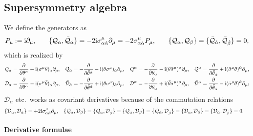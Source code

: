 \documentclass[CheatSheet]{subfiles}
\begin{document}
\subsection{Supersymmetry algebra}
We define the generators as
\begin{alignat}{3}
 P_\mu
 &:= {\mathrm{i}}\partial_\mu,
\quad&
 \{{\mathcal Q}_\alpha, \bar {\mathcal Q}_{\dot\alpha}\}
 &= -2{\mathrm{i}}\sigma^{\mu}_{\alpha{\dot\alpha}}\partial_\mu = -2\sigma^{\mu}_{\alpha{\dot\alpha}}P_\mu,
\quad&
  \{{\mathcal Q}_\alpha, {\mathcal Q}_\beta\} =   \{\bar {\mathcal Q}_{\dot\alpha}, \bar {\mathcal Q}_{\dot\beta}\} = 0,
\end{alignat}
which is realized by
\begin{align*}
{\mathcal Q}_\alpha &= \frac{\partial}{\partial \theta^{\alpha}}+{\mathrm{i}} (\sigma^{\mu}\bar\theta){}_{\alpha}\partial_{\mu},
&
\bar {\mathcal Q}_{\dot\alpha}&=-\frac{\partial}{\partial \bar\theta^{{\dot\alpha}}}-{\mathrm{i}} (\theta \sigma^{\mu}){}_{{\dot\alpha}}\partial_{\mu},
&
{\mathcal Q}^\alpha&=-\frac{\partial}{\partial \theta_{\alpha}}-{\mathrm{i}} (\bar\theta\bar\sigma^{\mu})^{\alpha}\partial_{\mu},
&
\bar {\mathcal Q}^{{\dot\alpha}}&=\frac{\partial}{\partial \bar\theta_{{\dot\alpha}}}+{\mathrm{i}} (\bar\sigma^{\mu}\theta)^{{\dot\alpha}}\partial_{\mu},
\\
{\mathcal D}_\alpha&=\frac{\partial}{\partial \theta^{\alpha}}-{\mathrm{i}} (\sigma^{\mu}\bar\theta){}_{\alpha}\partial_{\mu},
&
\bar {\mathcal D}_{\dot\alpha}&=-\frac{\partial}{\partial \bar\theta^{{\dot\alpha}}}+{\mathrm{i}} (\theta \sigma^{\mu}){}_{{\dot\alpha}}\partial_{\mu},
&
{\mathcal D}^\alpha&=-\frac{\partial}{\partial \theta_{\alpha}}+{\mathrm{i}} (\bar\theta\bar\sigma^{\mu})^{\alpha}\partial_{\mu},
&
\bar {\mathcal D}^{\dot\alpha}&=\frac{\partial}{\partial \bar\theta_{{\dot\alpha}}}-{\mathrm{i}} (\bar\sigma^{\mu}\theta)^{{\dot\alpha}}\partial_{\mu};
\end{align*}
${\mathcal D}_\alpha$ etc.~works as covariant derivatives because of the commutation relations
\begin{align*}
\{{\mathcal D}_\alpha, \bar {\mathcal D}_{\dot\alpha}\}&=+2{\mathrm{i}}\sigma^{\mu}_{\alpha{\dot\alpha}}\partial_\mu,&
\{{\mathcal Q}_\alpha, {\mathcal D}_\beta\}&=
\{{\mathcal Q}_\alpha, \bar {\mathcal D}_{\dot\beta}\}=
\{\bar {\mathcal Q}_{\dot\alpha}, {\mathcal D}_\beta\}=
\{\bar {\mathcal Q}_{\dot\alpha}, \bar {\mathcal D}_{\dot\beta}\}=
\{{\mathcal D}_\alpha, {\mathcal D}_\beta\}=
\{\bar {\mathcal D}_{\dot\alpha}, \bar {\mathcal D}_{\dot\beta}\}=0.
\end{align*}

\paragraph{Derivative formulae}
\end{document}
